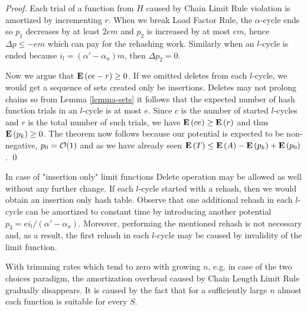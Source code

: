 \begin{proof}
Each trial of a function from $H$ caused by Chain Limit Rule violation is amortized by incrementing $r$. When we break Load Factor Rule, the $\alpha$-cycle ends so $p_1$ decreases by at least $2em$ and $p_2$ is increased by at most $em$, hence $\Delta p \leq -em$ which can pay for the rehashing work. Similarly when an $l$-cycle is ended because $i_l = (\alpha' - \alpha_u)m$, then $\Delta p_2 = 0$. 

Now we argue that $\mathbf{E}\left(ce - r\right) \geq 0$. If we omitted deletes from each $l$-cycle, we would get a sequence of sets created only be insertions. Deletes may not prolong chains so from Lemma \ref{lemma-sets} it follows that the expected number of hash function trials in an $l$-cycle is at most $e$. Since $c$ is the number of started $l$-cycles and $r$ is the total number of such trials, we have $\mathbf{E}\left(ce\right) \geq \mathbf{E}\left(r\right)$ and thus $\mathbf{E}\left(p_k\right) \geq 0$. The theorem now follows because our potential is expected to be non-negative, $p_0 = \mathcal{O}(1)$ and as we have already seen $\mathbf{E}\left(T\right) \leq \mathbf{E}\left(A\right) - \mathbf{E}\left(p_k\right) + \mathbf{E}\left(p_0\right)$.
\qed
\end{proof}

In case of "insertion only" limit functions Delete operation may be allowed as well without any further change. If each $l$-cycle started with a rehash, then we would obtain an insertion only hash table. Observe that one additional rehash in each $l$-cycle can be amortized to constant time by introducing another potential $p_3 = {ei_{l}}/{(\alpha' - \alpha_u)}$. Moreover, performing the mentioned rehash is not necessary and, as a result, the first rehash in each $l$-cycle may be caused by invalidity of the limit function.

With trimming rates which tend to zero with growing $n$, e.g. in case of the two choices paradigm, the amortization overhead caused by Chain Length Limit Rule gradually disappears. It is caused by the fact that for a sufficiently large $n$ almost each function is suitable for every $S$.
